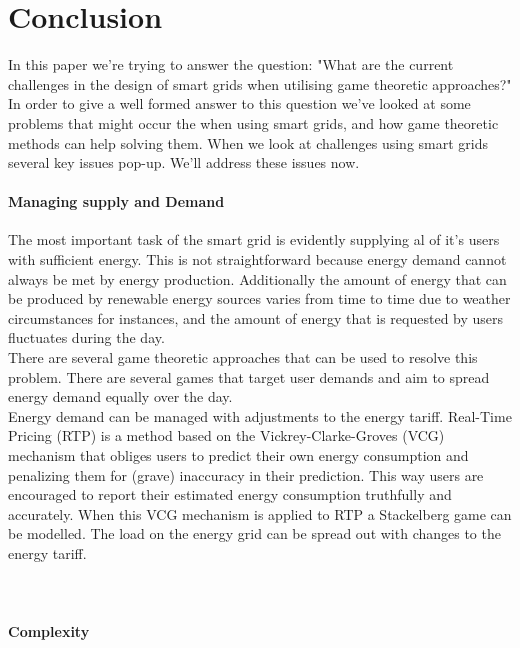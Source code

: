 \section{Conclusion}

In this paper we're trying to answer the question: "What are the current challenges in the design of smart grids when utilising game theoretic approaches?" In order to give a well formed answer to this question we've looked at some problems that might occur the when using smart grids, and how game theoretic methods can help solving them. When we look at challenges using smart grids several key issues pop-up. We'll address these issues now. 

\paragraph{Managing supply and Demand}
The most important task of the smart grid is evidently supplying al of it's users with sufficient energy. This is not straightforward because energy demand cannot always be met by energy production. Additionally the amount of energy that can be produced by renewable energy sources varies from time to time due to weather circumstances for instances, and the amount of energy that is requested by users fluctuates during the day. \\
There are several game theoretic approaches that can be used to resolve this problem. There are several games that target user demands and aim to spread energy demand equally over the day. \\
Energy demand can be managed with adjustments to the energy tariff. Real-Time Pricing (RTP) is a method based on the Vickrey-Clarke-Groves (VCG) mechanism that obliges users to predict their own energy consumption and penalizing them for (grave) inaccuracy in their prediction. This way users are encouraged to report their estimated energy consumption truthfully and accurately. When this VCG mechanism is applied to RTP a Stackelberg game can be modelled. The load on the energy grid can be spread out with changes to the energy tariff. \\
\\
\\

\paragraph{Complexity} 
\\
\\
\\

